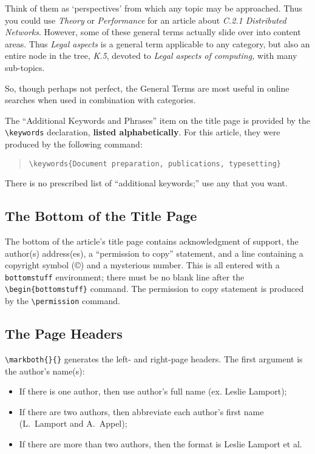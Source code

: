 \documentclass[hyperref]{acmtrans2e}
\begin{document}
Think of them as `perspectives' from which any topic may
be approached. Thus you could use {\em Theory} or {\em Performance} for an
article about {\em C.2.1 Distributed Networks}. However, 
some of these general terms actually slide over into
content areas. Thus {\em Legal aspects} is a general term
applicable to any category, but also an entire node in the tree,
{\em K.5}, devoted to {\em Legal aspects of computing,} with many sub-topics.

So, though perhaps not perfect, the General Terms are most useful
in online searches when used in combination with categories.

The ``Additional Keywords and Phrases'' item on the title page
is provided by the \verb|\keywords| declaration, {\bf listed alphabetically\/}.
For this article,  
they were produced by the following command:
\begin{quote}
\begin{verbatim}
\keywords{Document preparation, publications, typesetting}
\end{verbatim}
\end{quote}
There is no prescribed list of ``additional keywords;'' use any that
you want.

\subsection{The Bottom of the Title Page}

The bottom of the article's title page contains acknowledgment of
support, the author(s) address(es), a ``permission to copy'' statement,
and a line containing a copyright symbol (\copyright) and a mysterious
number.  This is all entered with a {\tt bottomstuff} environment;
there must be no blank line after the \verb|\begin{bottomstuff}|
command.  The permission to copy statement is produced by the
\verb|\permission| command.

\subsection{The Page Headers}

\verb|\markboth{}{}| generates the left- and right-page headers. The first 
argument is the author's name(s):

\begin{itemize}
\item If there is one author, then use author's full name (ex. Leslie Lamport);
\item If there are two authors, then abbreviate each author's first name
           (L.~Lamport and A.~Appel);
\item If there are more than two authors, then the format is Leslie Lamport et al.
\end{itemize}
\end{document}
